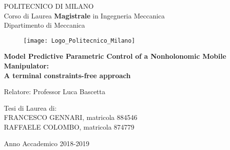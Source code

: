 \thispagestyle{empty}
\vspace*{-2cm} \bfseries{
\begin{center}
  \large
  POLITECNICO DI MILANO\\
  \normalsize
  Corso di Laurea \textbf{Magistrale} in Ingegneria Meccanica\\
  Dipartimento di Meccanica\\
  \begin{figure}[htbp]
    \begin{center}
      \texttt{[image: Logo\_Politecnico\_Milano]}
	 \centering
    \end{center}
  \end{figure}
  \vspace*{0.3cm} \LARGE


  \textbf{Model Predictive Parametric Control of a Nonholonomic Mobile Manipulator: \\ A terminal constraints-free approach}\\


\end{center}
\vspace*{1.5cm} \large
\begin{flushleft}


  Relatore: Professor Luca Bascetta \\
 

\end{flushleft}
\vspace*{1.5cm}
\begin{flushright}


  Tesi di Laurea di:\\ FRANCESCO GENNARI, matricola 884546 \\
  RAFFAELE COLOMBO, matricola 874779 \\

\end{flushright}
\vspace*{1.5cm}
\begin{center}



  Anno Accademico 2018-2019
\end{center} \clearpage
}
